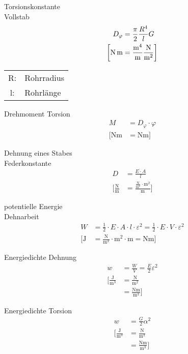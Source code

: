 \begin{karte}{Torsionskonstante\\Vollstab}
   \begin{align*}
       D_\varphi  &= \frac{\pi}{2} \frac{R^4}{l} G \\
       \bigg[ \si{\newton\meter} &= \frac{\si{\raiseto{4}\meter}}{\si{\meter}}\frac{\si{\newton}}{\si{\square\meter}} \bigg]
   \end{align*}
    \begin{tabular}[t]{cl}
        R: & Rohrradius \\
        l: & Rohrlänge
    \end{tabular}
\end{karte}

\begin{karte}{Drehmoment Torsion}
   \begin{align*}
       M &= D_\varphi \cdot \varphi \\
       \bigg[ \si{\newton\meter} &= \si{\newton\meter}\bigg]
   \end{align*}
\end{karte}

\begin{karte}{Dehnung eines Stabes \\ Federkonstante}
   \begin{align*}
       D &= \frac{E\cdot A}{l} \\
       \Bigg[ \frac{\si{\newton}}{\si{\meter}} &= \frac{\frac{\si{\newton}}{\si{\square\meter}} \cdot \si{\square\meter}}{\si{\meter}} \Bigg]
   \end{align*}
\end{karte}

\begin{karte}{potentielle Energie\\Dehnarbeit}
   \begin{align*}
       W &= \frac{1}{2} \cdot E \cdot A \cdot l \cdot \varepsilon^2 = \frac{1}{2} \cdot E \cdot V \cdot \varepsilon^2 \\
       \Bigg[ \si{\joule} &=  \frac{\si{\newton}}{\si{\square\meter}} \cdot \si{\square\meter} \cdot {\si{\meter}} = \si{\newton\meter} \Bigg]
   \end{align*}
\end{karte}

\begin{karte}{Energiedichte Dehnung}
   \begin{align*}
       w  &= \frac{W}{V} = \frac{E}{2} \varepsilon^2 \\
       \bigg[ \frac{\si{\joule}}{\si{\cubic\meter}} &= \frac{\si{\newton}}{\si{\square\meter}}  \\
           &= \frac{\si{\newton\meter}}{\si{\cubic\meter}}  \bigg]
   \end{align*}
\end{karte}

\begin{karte}{Energiedichte Torsion}
   \begin{align*}
       w  &= \frac{G}{2} \alpha^2 \\
       \bigg[ \frac{\si{\joule}}{\si{\cubic\meter}} &= \frac{\si{\newton}}{\si{\square\meter}}  \\
           &= \frac{\si{\newton\meter}}{\si{\cubic\meter}}  \bigg]
   \end{align*}
\end{karte}

